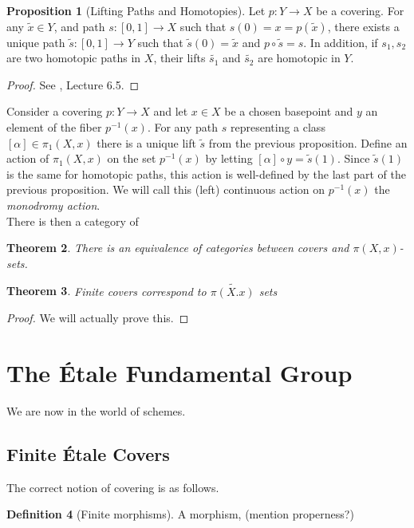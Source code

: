 \documentclass{article}
\newtheorem{theorem}{Theorem}[section]
\theoremstyle{definition}
\newtheorem{proposition}[theorem]{Proposition}
\newtheorem{definition}[theorem]{Definition}
\theoremstyle{remark}
\begin{document}
\begin{proposition}[Lifting Paths and Homotopies]	
	Let $p: Y \to X$ be a covering. 
	For any $\widetilde{x} \in Y$, and path $s: [0,1] \to X$ such that $s(0) = x = p(\widetilde{x})$, there exists a unique path $\widetilde{s}:[0,1] \to Y$ such that $\widetilde{s}(0) = \widetilde{x}$ and $p \circ \widetilde{s} = s$.
	In addition, if $s_1, s_2$ are two homotopic paths in $X$, their lifts $\widetilde{s_1}$ and $\widetilde{s_2}$ are homotopic in $Y$.
\end{proposition}

\begin{proof}
	See \cite{FomenkoFuchs}, Lecture 6.5.
\end{proof}
		
Consider a covering $p: Y \to X$ and let $x \in X$ be a chosen basepoint and $y$ an element of the fiber $p^{-1}(x)$.
	For any path $s$ representing a class $[\alpha] \in \pi_1(X,x)$ there is a unique lift $\widetilde{s}$ from the previous proposition.
	Define an action of $\pi_1(X,x)$ on the set $p^{-1}(x)$ by letting $[\alpha] \circ y = \widetilde{s}(1)$.
	Since $\widetilde{s}(1)$ is the same for homotopic paths, this action is well-defined by the last part of the previous proposition.
	We will call this (left) continuous action on $p^{-1}(x)$ the \textit{monodromy action}.\\

There is then a category of 
\begin{theorem}
	There is an equivalence of categories between covers and $\pi(X,x)$-sets.
\end{theorem}


\begin{theorem}
	Finite covers correspond to $\widetilde{\pi(X.x)}$ sets
\end{theorem}
\begin{proof}
	We will actually prove this.
\end{proof}


\section{The \'Etale Fundamental Group}

We are now in the world of schemes.

\subsection{Finite \'Etale Covers}
The correct notion of covering is as follows.
\begin{definition}[Finite morphisms]
	A morphism, (mention properness?)
\end{definition}
\end{document}
